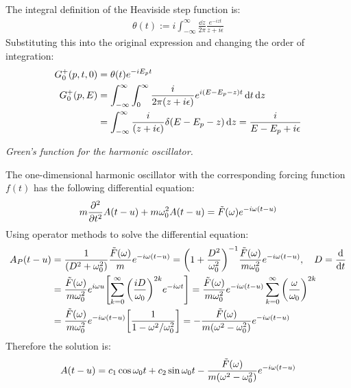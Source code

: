 \documentclass{report}
\begin{document}
\begin{subquests}
\begin{subquests}
		\item The integral definition of the Heaviside step function is:
		\begin{gather*}
			\theta(t) := i\int_{-\infty}^{\infty}\frac{\dd z}{2\pi}\frac{e^{-izt}}{z+i\epsilon}
		\end{gather*}
		Substituting this into the original expression and changing the order of integration:
		\begin{align*}
			G^+_0(p,t,0) & = \theta(t)e^{-iE_p t} \\
			G^+_0(p,E) & = \int_{-\infty}^{\infty}\int_{0}^{\infty}\frac{i}{2\pi\pqty{z+i\epsilon}}e^{i\pqty{E - E_p - z}t} \dd{t}\dd{z} \\
			& = \int_{-\infty}^{\infty}\frac{i}{\pqty{z+i\epsilon}}\delta{\pqty{E - E_p - z}} \dd{z} = \frac{i}{E - E_p + i\epsilon}
		\end{align*}
	\end{subquests}
	\newpage
	\item \emph{Green's function for the harmonic oscillator.}
	\begin{subquests}
		\item The one-dimensional harmonic oscillator with the corresponding forcing function $f(t)$ has the following differential equation:
		\begin{gather*}
			m\pdv[2]{t}A(t-u) + m\omega_0^2A(t-u) = \tilde F(\omega)e^{-i\omega(t-u)}
		\end{gather*}
		Using operator methods to solve the differential equation:
		\begin{align*}
			A_P(t-u) & = \frac{1}{\pqty{D^2 + \omega_0^2}}\frac{\tilde F(\omega)}{m}e^{-i\omega(t-u)} = \pqty{1 + \frac{D^2}{\omega_0^2}}^{-1}\frac{\tilde F(\omega)}{m\omega_0^2}e^{-i\omega(t-u)}, \quad D = \dv{t} \\
			& = \frac{\tilde F(\omega)}{m\omega_0^2}e^{i\omega u}\bqty{\sum_{k=0}^{\infty} \pqty{\frac{iD}{\omega_0}}^{2k}e^{-i\omega t}} = \frac{\tilde F(\omega)}{m\omega_0^2}e^{-i\omega(t-u)}\sum_{k=0}^{\infty}\pqty{\frac{\omega}{\omega_0}}^{2k}\\
			& = \frac{\tilde F(\omega)}{m\omega_0^2}e^{-i\omega(t-u)}\bqty{\frac{1}{1-\omega^2/\omega_0^2}} = -\frac{\tilde F(\omega)}{m\pqty{\omega^2 - \omega_0^2}}e^{-i\omega(t-u)} 
		\end{align*}
		Therefore the solution is:
		\begin{gather*}
			A(t-u) = c_1 \cos\omega_0 t + c_2 \sin\omega_0 t - \frac{\tilde F(\omega)}{m\pqty{\omega^2 - \omega_0^2}}e^{-i\omega(t-u)} 
		\end{gather*}


\end{subquests}
\end{subquests}
\end{document}
